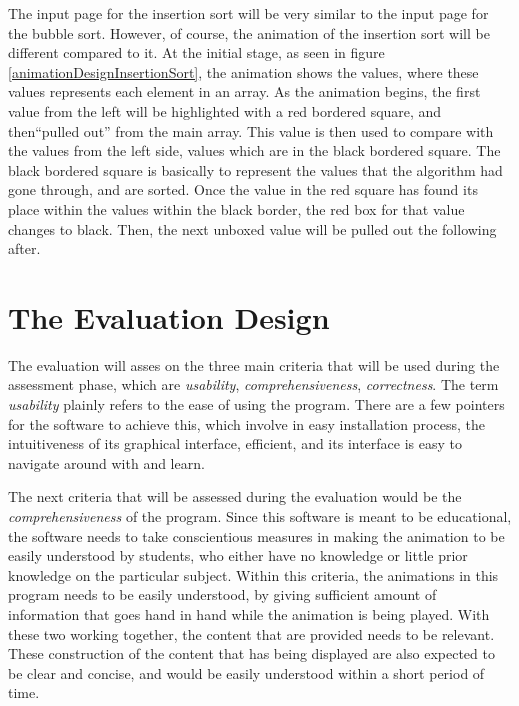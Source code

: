 The input page for the insertion sort will be very similar to the input page for the bubble sort. However, of course, the animation of the insertion sort will be different compared to it. At the initial stage, as seen in figure \ref{animationDesignInsertionSort}, the animation shows the values, where these values represents each element in an array. As the animation begins, the first value from the left will be highlighted with a red bordered square, and then``pulled out'' from the main array. This value is then used to compare with the values from the left side, values which are in the black bordered square. The black bordered square is basically to represent the values that the algorithm had gone through, and are sorted. Once the value in the red square has found its place within the values within the black border, the red box for that value changes to black. Then, the next unboxed value will be pulled out the following after.



\section{The Evaluation Design} \label{sec:evaluationDesign}


The evaluation will asses on the three main criteria that will be used during the assessment phase, which are \textit{usability}, \textit{comprehensiveness}, \textit{correctness}. The term \textit{usability} plainly refers to the ease of using the program. There are a few pointers for the software to achieve this, which involve in easy installation process, the intuitiveness of its graphical interface, efficient, and its interface is easy to navigate around with and learn.

The next criteria that will be assessed during the evaluation would be the \textit{comprehensiveness} of the program. Since this software is meant to be educational, the software needs to take conscientious measures in making the animation to be easily understood by students, who either have no knowledge or little prior knowledge on the particular subject. Within this criteria, the animations in this program needs to be easily understood, by giving sufficient amount of information that goes hand in hand while the animation is being played. With these two working together, the content that are provided needs to be relevant. These construction of the content that has being displayed are also expected to be clear and concise, and would be easily understood within a short period of time. 

